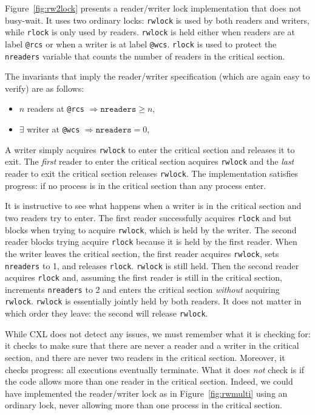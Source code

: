 \documentclass{report}
\begin{document}
Figure~\ref{fig:rw2lock} presents a reader/writer lock implementation
that does not busy-wait.
It uses two ordinary locks: \texttt{rwlock} is used by both readers and writers,
while \texttt{rlock} is only used by readers.
\texttt{rwlock} is held either when readers are at label \texttt{@rcs}
or when a writer is at label \texttt{@wcs}.
\texttt{rlock} is used to protect the \texttt{nreaders} variable that
counts the number of readers in the critical section. 

The invariants that imply the reader/writer specification
(which are again easy to verify) are as follows:

\begin{itemize}
\item $n$ readers at \texttt{@rcs} $\Rightarrow \mathtt{nreaders} \ge n$,
\item $\exists$ writer at \texttt{@wcs} $\Rightarrow \mathtt{nreaders} = 0$,
\end{itemize}

A writer simply acquires \texttt{rwlock} to enter the critical section
and releases it to exit.  The \emph{first} reader to enter the critical
section acquires \texttt{rwlock} and the \emph{last} reader to exit
the critical section releases \texttt{rwlock}.
The implementation satisfies progress: if no process is in the critical
section than any process enter.

It is instructive to see what happens when a writer is in the critical
section and two readers try to enter.  The first reader successfully
acquires \texttt{rlock} and but blocks when trying to acquire
\texttt{rwlock}, which is held by the writer.  The second reader blocks
trying acquire \texttt{rlock} because it is held by the first reader.
When the writer leaves the critical section, the first reader acquires
\texttt{rwlock}, sets \texttt{nreaders} to 1, and releases \texttt{rlock}.
\texttt{rwlock} is still held.
Then the second reader acquires \texttt{rlock} and, assuming the first
reader is still in the critical section, increments \texttt{nreaders} to 2
and enters the critical section \emph{without} acquiring \texttt{rwlock}.
\texttt{rwlock} is essentially jointly held by both readers.
It does not matter in which order they leave: the second will release
\texttt{rwlock}.

While CXL does not detect any issues, we must remember what it is checking
for: it checks to make sure that there are never a reader and a writer
in the critical section, and there are never two readers in the critical
section.  Moreover, it checks progress: all executions eventually terminate.
What it does \emph{not} check is if the code allows more than one reader
in the critical section.  Indeed, we could have implemented the reader/writer
lock as in Figure~\ref{fig:rwmulti} using an ordinary lock, never allowing
more than one process in the critical section.
\end{document}
